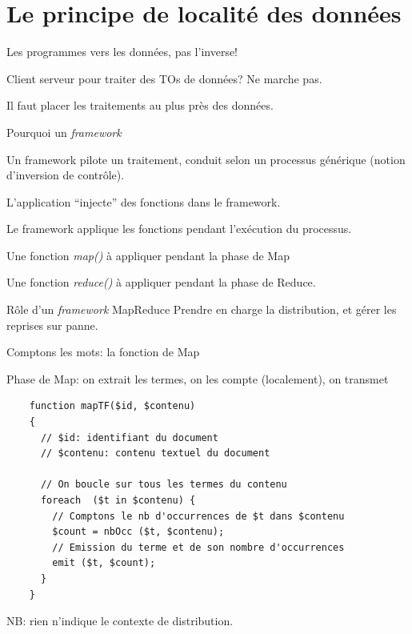 
\section{Le principe de localité des données}

\begin{frame}{Les programmes vers les données, pas l'inverse!}

Client serveur pour traiter des TOs de données? \alert{Ne marche pas}.

\vfill


\vfill

Il faut placer les traitements au plus près des données.

\end{frame}


\begin{frame}{Pourquoi un \textit{framework}}

Un framework \alert{pilote} un traitement, conduit selon un processus générique (notion d'inversion de contrôle).


\vfill

L'application ``injecte'' des fonctions dans le framework.

 
\vfill

Le framework applique les fonctions  pendant l'exécution du processus.

\vfill

\begin{redbullet}
  \item Une fonction \textit{map()} à appliquer pendant la phase de Map
  \item Une fonction \textit{reduce()} à appliquer pendant la phase de Reduce.
\end{redbullet}

\begin{remblock}{Rôle d'un \textit{framework} MapReduce}
Prendre en charge la distribution, et gérer les reprises sur panne.
\end{remblock}
\end{frame}


\begin{frame}[fragile]{Comptons les mots: la fonction de Map}

Phase de Map: on extrait les termes, on les compte (localement), on transmet

\begin{verbatim}
    function mapTF($id, $contenu)
    {
      // $id: identifiant du document
      // $contenu: contenu textuel du document

      // On boucle sur tous les termes du contenu
      foreach  ($t in $contenu) {
        // Comptons le nb d'occurrences de $t dans $contenu
        $count = nbOcc ($t, $contenu);
        // Emission du terme et de son nombre d'occurrences
        emit ($t, $count);
      }
    }
\end{verbatim}

NB: rien n'indique le contexte de distribution.

\end{frame}


